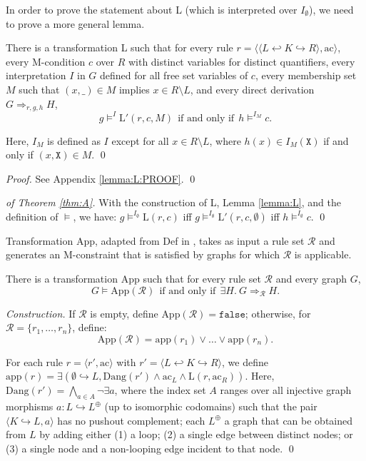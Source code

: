 \documentclass{llncs}
\newcommand{\R}{\mathcal{R}}
\begin{document}
In order to prove the statement about L (which is interpreted over $I_\emptyset$), we need to prove a more general lemma.

\begin{lemma}\label{lemma:L}\rm
	There is a transformation L such that for every rule $r = \langle \langle L \hookleftarrow K \hookrightarrow R \rangle, \text{ac} \rangle$, every M-condition $c$ over $R$ with distinct variables for distinct quantifiers, every interpretation $I$ in $G$ defined for all free set variables of $c$, every membership set $M$ such that $(x,\_)\in M$ implies $x\in R\setminus L$, and every direct derivation $G\Rightarrow_{r,g,h} H$,
	\[ g \models^{I} \text{L}'(r,c,M)\ \ \text{if and only if}\ \ h \models^{I_M} c. \]
	
	\noindent Here, $I_M$ is defined as $I$ except for all $x\in R\setminus L$, where $h(x) \in I_M(\mathtt{X})$ if and only if $(x,\mathtt{X})\in M$.
	\qed
\end{lemma}

\begin{proof}
	See Appendix \ref{lemma:L:PROOF}.
	\qed
\end{proof}

\begin{proof}[of Theorem \ref{thm:A}]\rm
	With the construction of L, Lemma \ref{lemma:L}, and the definition of $\models$, we have: $g \models^{I_\emptyset} \text{L}(r,c)$ iff $g \models^{I_\emptyset} \text{L}'(r,c,\emptyset)$ iff $h \models^{I_\emptyset} c$.
	\qed
\end{proof}

Transformation App, adapted from Def in \cite{Pennemann09a}, takes as input a rule set $\R$ and generates an M-constraint that is satisfied by graphs for which $\R$ is applicable.

\begin{theorem}\label{thm:A}\rm
	There is a transformation App such that for every rule set $\R$ and every graph $G$,
	\[ G \models \text{App}(\R)\ \ \text{if and only if}\ \ \exists H.\ G \Rightarrow_{\R} H. \]

\noindent \emph{Construction.} If $\R$ is empty, define $\text{App}(\R)=\mathtt{false}$; otherwise, for $\R = \{r_1,\dots,r_n\}$, define:
	\[ \text{App}(\R) = \text{app}(r_1) \vee \dots \vee \text{app}(r_n). \]
	
	\noindent For each rule $r = \langle r',\text{ac}\rangle$ with $r' = \langle L \hookleftarrow K \hookrightarrow R \rangle$, we define $\text{app}(r) = \exists(\emptyset\hookrightarrow L,\text{Dang}(r') \wedge \text{ac}_L \wedge \text{L}(r,\text{ac}_R))$. Here, $\text{Dang}(r') = \bigwedge_{a\in A} \neg \exists a$, where the index set $A$ ranges over all injective graph morphisms $a\!:L \hookrightarrow L^\oplus$ (up to isomorphic codomains) such that the pair $\langle K \hookrightarrow L, a \rangle$ has no pushout complement; each $L^\oplus$ a graph that can be obtained from $L$ by adding either (1) a loop; (2) a single edge between distinct nodes; or (3) a single node and a non-looping edge incident to that node.
	\qed
\end{theorem}
\end{document}
